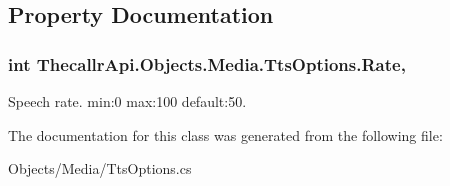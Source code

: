 \subsection{Property Documentation}
\hypertarget{class_thecallr_api_1_1_objects_1_1_media_1_1_tts_options_a81d17f4f948622b47f5e10f8e1c09b85}{
\subsubsection[{Rate}]{\setlength{\rightskip}{0pt plus 5cm}int Thecallr\+Api.\+Objects.\+Media.\+Tts\+Options.\+Rate\hspace{0.3cm}{\ttfamily [get]}, {\ttfamily [set]}}}\label{class_thecallr_api_1_1_objects_1_1_media_1_1_tts_options_a81d17f4f948622b47f5e10f8e1c09b85}


Speech rate. min\+:0 max\+:100 default\+:50. 



The documentation for this class was generated from the following file\+:\begin{DoxyCompactItemize}
\item 
Objects/\+Media/Tts\+Options.\+cs\end{DoxyCompactItemize}
